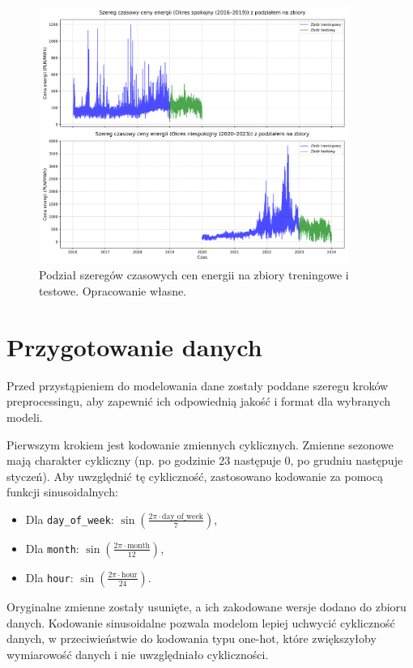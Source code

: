\begin{figure}[h]
    \centering
    \includegraphics[width=0.9\textwidth]{../../plots/periods_split_combined.png}
    \caption{Podział szeregów czasowych cen energii na zbiory treningowe i testowe. Opracowanie własne.}
    \label{fig:periods_split_combined}
\end{figure}

\section{Przygotowanie danych}

Przed przystąpieniem do modelowania dane zostały poddane szeregu kroków preprocessingu, aby zapewnić ich odpowiednią jakość i format dla wybranych modeli.

Pierwszym krokiem jest kodowanie zmiennych cyklicznych. Zmienne sezonowe mają charakter cykliczny (np. po godzinie 23 następuje 0, po grudniu następuje styczeń). Aby uwzględnić tę cykliczność, zastosowano kodowanie za pomocą funkcji sinusoidalnych:

\begin{itemize}
    \item Dla \texttt{day\_of\_week}: \(\sin\left(\frac{2\pi \cdot \text{day\_of\_week}}{7}\right)\),
    \item Dla \texttt{month}: \(\sin\left(\frac{2\pi \cdot \text{month}}{12}\right)\),
    \item Dla \texttt{hour}: \(\sin\left(\frac{2\pi \cdot \text{hour}}{24}\right)\).
\end{itemize}

Oryginalne zmienne zostały usunięte, a ich zakodowane wersje dodano do zbioru danych. Kodowanie sinusoidalne pozwala modelom lepiej uchwycić cykliczność danych, w przeciwieństwie do kodowania typu one-hot, które zwiększyłoby wymiarowość danych i nie uwzględniało cykliczności.

